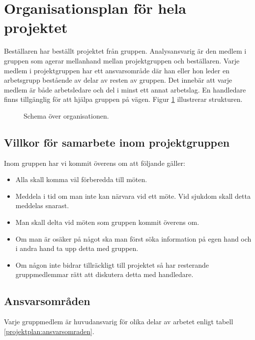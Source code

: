 \section{Organisationsplan för hela projektet}
Beställaren har beställt projektet från gruppen. Analysansvarig är den medlem i gruppen som agerar mellanhand mellan projektgruppen och beställaren. Varje medlem i projektgruppen har ett ansvarsområde där han eller hon leder en arbetsgrupp bestående av delar av resten av gruppen. Det innebär att varje medlem är både arbetsledare och del i minst ett annat arbetslag. En handledare finns tillgänglig för att hjälpa gruppen på vägen. Figur \ref{projektplan:organisationsplan} illustrerar strukturen.

\begin{figure}[H]
\center
{}%

%
\caption{Schema över organisationen.} \label{projektplan:organisationsplan}
\endcenter
\end{figure}

\subsection{Villkor för samarbete inom projektgruppen}
Inom gruppen har vi kommit överens om att följande gäller:
\begin{itemize}
\item{Alla skall komma väl förberedda till möten.}
\item{Meddela i tid om man inte kan närvara vid ett möte. Vid sjukdom skall detta meddelas snarast.}
\item{Man skall delta vid möten som gruppen kommit överens om.}

\item{Om man är osäker på något ska man först söka information på egen hand och i andra hand ta upp detta med gruppen.}
\item{Om någon inte bidrar tillräckligt till projektet så har resterande gruppmedlemmar rätt att diskutera detta med handledare.}
\end{itemize}

\newpage
\subsection{Ansvarsområden}
Varje gruppmedlem är huvudansvarig för olika delar av arbetet enligt tabell \ref{projektplan:ansvarsomraden}.

